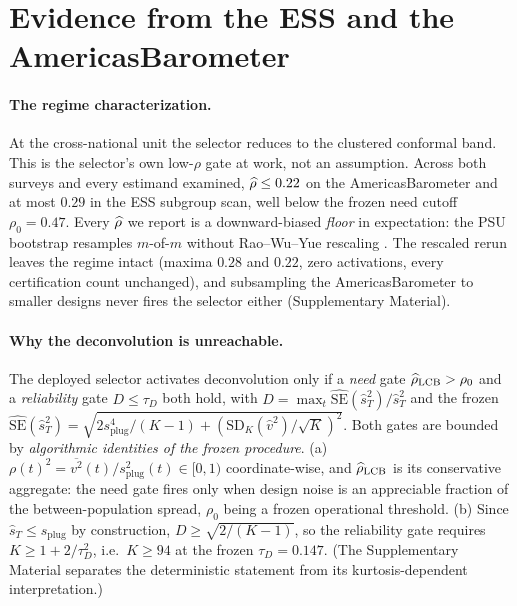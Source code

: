\section{Evidence from the ESS and the AmericasBarometer}\label{sec:evidence}

\paragraph{The regime characterization.} At the cross-national unit the
selector reduces to the clustered conformal band. This is the selector's own
low-$\rho$ gate at work, not an assumption. Across both surveys and
every estimand examined, $\widehat{\rho}\le0.22$ on the AmericasBarometer and at
most $0.29$ in the ESS subgroup scan, well below the frozen need cutoff
$\rho_0=0.47$. Every $\widehat{\rho}$ we report is a downward-biased \emph{floor}
in expectation: the PSU bootstrap resamples $m$-of-$m$ without
Rao--Wu--Yue rescaling \citep{rao1992recent}. The rescaled rerun leaves the
regime intact (maxima $0.28$ and $0.22$, zero activations, every
certification count unchanged), and subsampling the AmericasBarometer to
smaller designs never fires the selector either (Supplementary Material).

\paragraph{Why the deconvolution is unreachable.}

\begin{proposition}\label{prop:unreach}
The deployed selector activates deconvolution only if a \emph{need} gate
$\widehat{\rho}_{\mathrm{LCB}}>\rho_0$ and a \emph{reliability} gate $D\le\tau_D$ both
hold, with $D=\max_t \widehat{\mathrm{SE}}(\widehat s_T^2)/\widehat s_T^2$ and
the frozen
$\widehat{\mathrm{SE}}(\widehat s_T^2)=
\sqrt{2s_{\mathrm{plug}}^4/(K{-}1)+(\mathrm{SD}_K(\widehat v^2)/\sqrt K)^2}$.
Both gates are bounded by \emph{algorithmic identities of the frozen
procedure}.
(a) $\rho(t)^2=\overline{v^2}(t)/s_{\mathrm{plug}}^2(t)\in[0,1)$
coordinate-wise, and $\widehat{\rho}_{\mathrm{LCB}}$ is its conservative aggregate:
the need gate fires only when design noise is an appreciable fraction of the
between-population spread, $\rho_0$ being a frozen operational threshold.
(b) Since $\widehat s_T\le s_{\mathrm{plug}}$ by construction,
$D\ge\sqrt{2/(K-1)}$, so the reliability gate requires $K\ge1+2/\tau_D^2$, i.e.\
$K\ge94$ at the frozen $\tau_D=0.147$. (The Supplementary Material separates
the deterministic statement from its kurtosis-dependent interpretation.)
\end{proposition}

